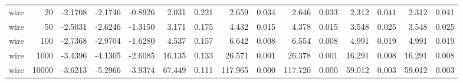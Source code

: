 \begin{tabular}{lrrrrrrrrrrrrrr}
wire & 20 & -2.1708 & -2.1746 & -0.8926 & 2.031 & 0.221 & 2.659 & 0.034 & 2.646 & 0.033 & 2.312 & 0.041 & 2.312 & 0.041 \\
wire & 50 & -2.5031 & -2.6246 & -1.3150 & 3.171 & 0.175 & 4.432 & 0.015 & 4.378 & 0.015 & 3.548 & 0.025 & 3.548 & 0.025 \\
wire & 100 & -2.7368 & -2.9704 & -1.6280 & 4.537 & 0.157 & 6.642 & 0.008 & 6.554 & 0.008 & 4.991 & 0.019 & 4.991 & 0.019 \\
wire & 1000 & -3.4396 & -4.1305 & -2.6085 & 16.135 & 0.133 & 26.571 & 0.001 & 26.378 & 0.001 & 16.291 & 0.008 & 16.291 & 0.008 \\
wire & 10000 & -3.6213 & -5.2966 & -3.9374 & 67.449 & 0.111 & 117.965 & 0.000 & 117.720 & 0.000 & 59.012 & 0.003 & 59.012 & 0.003 \\
\bottomrule
\end{tabular}
